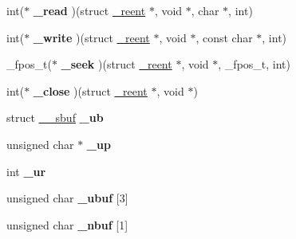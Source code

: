 \begin{DoxyCompactItemize}
\item 
int($\ast$ {\bfseries \+\_\+read} )(struct \hyperlink{struct__reent}{\+\_\+reent} $\ast$, void $\ast$, char $\ast$, int)\hypertarget{struct____s_f_i_l_e_a03b67a935d3b53249511e5ad0cc06a96}{}\label{struct____s_f_i_l_e_a03b67a935d3b53249511e5ad0cc06a96}

\item 
int($\ast$ {\bfseries \+\_\+write} )(struct \hyperlink{struct__reent}{\+\_\+reent} $\ast$, void $\ast$, const char $\ast$, int)\hypertarget{struct____s_f_i_l_e_adc87769142dc3ceffcec62585e2bf5be}{}\label{struct____s_f_i_l_e_adc87769142dc3ceffcec62585e2bf5be}

\item 
\+\_\+fpos\+\_\+t($\ast$ {\bfseries \+\_\+seek} )(struct \hyperlink{struct__reent}{\+\_\+reent} $\ast$, void $\ast$, \+\_\+fpos\+\_\+t, int)\hypertarget{struct____s_f_i_l_e_a569c75f68b8037c65d6cb6a79d88a7f2}{}\label{struct____s_f_i_l_e_a569c75f68b8037c65d6cb6a79d88a7f2}

\item 
int($\ast$ {\bfseries \+\_\+close} )(struct \hyperlink{struct__reent}{\+\_\+reent} $\ast$, void $\ast$)\hypertarget{struct____s_f_i_l_e_abf107d03f12e1c997b8e1d54a41c8bf9}{}\label{struct____s_f_i_l_e_abf107d03f12e1c997b8e1d54a41c8bf9}

\item 
struct \hyperlink{struct____sbuf}{\+\_\+\+\_\+sbuf} {\bfseries \+\_\+ub}\hypertarget{struct____s_f_i_l_e_ab68e38ed3ab39e0ac019077f575d8d98}{}\label{struct____s_f_i_l_e_ab68e38ed3ab39e0ac019077f575d8d98}

\item 
unsigned char $\ast$ {\bfseries \+\_\+up}\hypertarget{struct____s_f_i_l_e_aa36de8449bb4c57ea3c7f3f413d3da1c}{}\label{struct____s_f_i_l_e_aa36de8449bb4c57ea3c7f3f413d3da1c}

\item 
int {\bfseries \+\_\+ur}\hypertarget{struct____s_f_i_l_e_a23ee376730842adc806de4a2859e84d0}{}\label{struct____s_f_i_l_e_a23ee376730842adc806de4a2859e84d0}

\item 
unsigned char {\bfseries \+\_\+ubuf} \mbox{[}3\mbox{]}\hypertarget{struct____s_f_i_l_e_a0915661484aff48e1f8d3dde425d4c01}{}\label{struct____s_f_i_l_e_a0915661484aff48e1f8d3dde425d4c01}

\item 
unsigned char {\bfseries \+\_\+nbuf} \mbox{[}1\mbox{]}\hypertarget{struct____s_f_i_l_e_ad0298f63eda310496ec8ede8c258f9f9}{}\label{struct____s_f_i_l_e_ad0298f63eda310496ec8ede8c258f9f9}


\end{DoxyCompactItemize}
